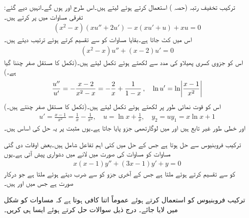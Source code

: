 :ترکیب تخفیف رتبہ (حصہ ) استعمال کرتے ہوئے  لیتے ہیں۔اس طرح  اور  ہوں گے۔انہیں دیے گئے تفرقی مساوات میں پر کرتے ہیں۔
\begin{align*}
(x^2-x)(xu''+2u')-x(xu'+u)+xu=0
\end{align*}
اس میں  کٹ جاتا ہے۔بقایا مساوات کو  سے تقسیم کرتے ہوئے ترتیب دیتے ہیں۔
\begin{align*}
(x^2-x)u''+(x-2)u'=0
\end{align*}
اس کو جزوی کسری پھیلاو کی مدد سے لکھتے ہوئے تکمل لیتے ہیں۔(تکمل کا مستقل صفر چننا گیا ہے۔)
\begin{align*}
\frac{u''}{u'}=-\frac{x-2}{x^2-x}=-\frac{2}{x}+\frac{1}{1-x}\,,\quad \ln u'=\ln \abs{\frac{x-1}{x^2}}
\end{align*}
اس کو قوت نمائی طور پر لکھتے ہوئے تکمل لیتے ہیں۔(تکمل کا مستقل صفر چنتے ہیں۔)
\begin{align*}
u'=\frac{x-1}{x^2}=\frac{1}{x}-\frac{1}{x^2}, \quad u=\ln x+\frac{1}{x}, \quad y_2=uy_1=x\ln x+1
\end{align*}
 اور  خطی طور غیر تابع ہیں اور  میں لوگارتھمی جزو پایا جاتا ہے۔یوں مثبت  پر یہ حل کی اساس ہیں۔

ترکیب فروبنیوس سے  حل ہوتا ہے جس کے حل میں کئی اہم تفاعل شامل ہیں۔بعض اوقات دی گئی مساوات کو مساوات  کی صورت میں لانے میں دشواری پیش آتی ہے۔یوں 
\begin{align*}
x(x-1)y''+(3x-1)y'+y=0
\end{align*}
کو  سے تقسیم کرتے ہوئے   ملتا ہے جس کے آخری جزو کو  سے ضرب دیتے ہوئے  ملتا ہے جو درکار صورت ہے جس میں  اور  ہیں۔ 

ترکیب فروبنیوس کو استعمال کرتے ہوئے عموماً اتنا کافی ہوتا ہے کہ مساوات کو  شکل میں لایا جائے۔ درج ذیل سوالات حل کرتے ہوئے ایسا ہی کریں۔

